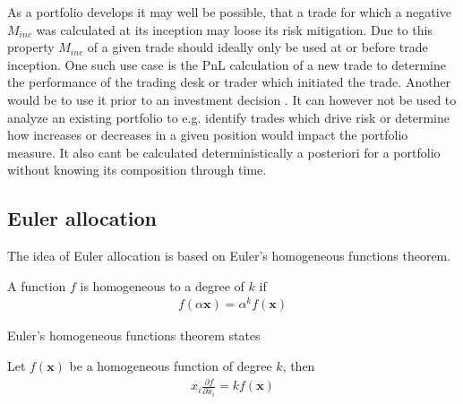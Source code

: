 \documentclass[../Thesis_AHoecherl.tex]{subfiles}
\begin{document}
As a portfolio develops it may well be possible, that a trade for which a negative $M_{inc}$ was calculated at its inception may loose its risk mitigation. 
Due to this property $M_{inc}$ of a given trade should ideally only be used at or before trade inception. 
One such use case is the PnL calculation of a new trade to determine the performance of the trading desk or trader which initiated the trade. 
Another would be to use it prior to an investment decision \cite{tibiletti2001incremental}. 
It can however not be used to analyze an existing portfolio to e.g. identify trades which drive risk or determine how increases or decreases in a given position would impact the portfolio measure. 
It also cant be calculated deterministically a posteriori for a portfolio without knowing its composition through time.


\subsection{Euler allocation}\label{sec:Euler allocation}

The idea of Euler allocation is based on Euler's homogeneous functions theorem. 

\begin{definition}
    A function $f$ is homogeneous to a degree of $k$ if 
    \begin{align}
        f\left(\alpha \mathbf{x}\right) = \alpha^k f\left(\mathbf{x}\right)
    \end{align}
\end{definition}

Euler's homogeneous functions theorem states
\begin{theorem}
    Let $f\left(\mathbf{x}\right)$ be a homogeneous function of degree $k$, then
    \begin{align}
        x_i \frac{\partial f}{\partial x_i} = k f(\mathbf{x})
    \end{align}
\end{theorem}
\end{document}
